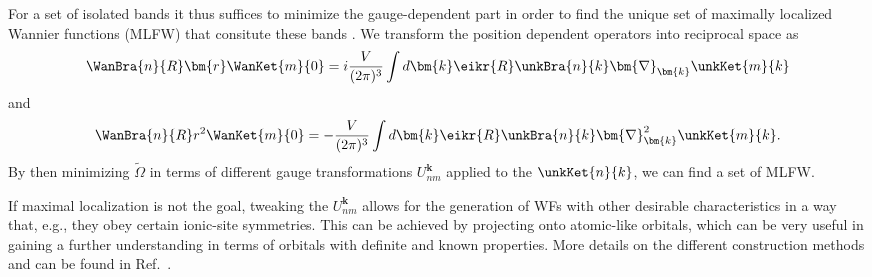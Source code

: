 For a set of isolated bands it thus suffices to minimize the gauge-dependent part in order to find the  unique set of maximally localized Wannier functions (MLFW) that consitute these bands \cite{Kunes2004, Marzari2012}.
We transform the position dependent operators into reciprocal space as \cite{Blount1962}
\begin{equation}
\WanBra{n}{R}\bm{r}\WanKet{m}{0} = i \frac{V}{(2\pi)^3}\int d\bm{k} \eikr{R}\unkBra{n}{k} \bm{\nabla}_{\bm{k}} \unkKet{m}{k}
\end{equation}
and
\begin{equation}
\WanBra{n}{R}r^2\WanKet{m}{0} = -\frac{V}{(2\pi)^3}\int d\bm{k} \eikr{R}\unkBra{n}{k} \bm{\nabla}_{\bm{k}}^2 \unkKet{m}{k}.
\end{equation}
By then minimizing $\tilde\Omega$ in terms of different gauge transformations $U_{nm}^{\bm{k}}$ applied to the $\unkKet{n}{k}$, we can find a set of MLFW. 

If maximal localization is not the goal, tweaking the $U_{nm}^{\bm{k}}$ allows for the generation of WFs with other desirable characteristics in a way that, e.g., they obey certain ionic-site symmetries.
This can be achieved by projecting onto atomic-like orbitals, which can be very useful in gaining a further understanding in terms of orbitals with definite and known properties.
More details on the different construction methods and can be found in Ref.~\cite{Marzari2012}.

